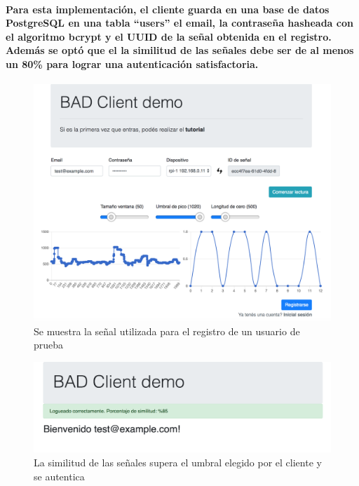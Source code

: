 \documentclass{article}
\begin{document}
\paragraph{
Para esta implementación, el cliente guarda en una base de datos PostgreSQL en una tabla “users” el email, la contraseña hasheada con el algoritmo bcrypt y el UUID de la señal obtenida en el registro. Además se optó que el la similitud de las señales debe ser de al menos un 80\% para lograr una autenticación satisfactoria.
}

\begin{figure}[ht]
    \centering
    \includegraphics[width=\textwidth]{success_1.png}%
    \caption{Se muestra la señal utilizada para el registro de un usuario de prueba}
    \label{fig:success-1}
\end{figure}

\begin{figure}[ht]
    \centering
    \includegraphics[width=\textwidth]{success_1_result.png}%
    \caption{La similitud de las señales supera el umbral elegido por el cliente y se autentica}
    \label{fig:success-2}
\end{figure}
\end{document}
